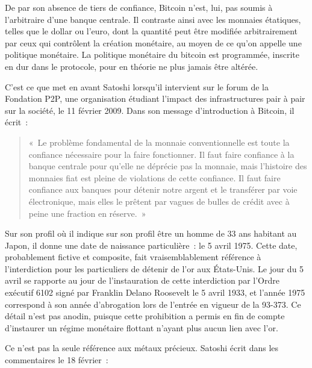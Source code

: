 De par son absence de tiers de confiance, Bitcoin n'est, lui, pas soumis à l'arbitraire d'une banque centrale. Il contraste ainsi avec les monnaies étatiques, telles que le dollar ou l'euro, dont la quantité peut être modifiée arbitrairement par ceux qui contrôlent la création monétaire, au moyen de ce qu'on appelle une politique monétaire. La politique monétaire du bitcoin est programmée, inscrite en dur dans le protocole, pour en théorie ne plus jamais être altérée.

C'est ce que met en avant Satoshi lorsqu'il intervient sur le forum de la Fondation P2P, une organisation étudiant l'impact des infrastructures pair à pair sur la société, le 11 février 2009. Dans son message d'introduction à Bitcoin, il écrit~:

\begin{quote}
«~Le problème fondamental de la monnaie conventionnelle est toute la confiance nécessaire pour la faire fonctionner. Il faut faire confiance à la banque centrale pour qu'elle ne déprécie pas la monnaie, mais l'histoire des monnaies fiat est pleine de violations de cette confiance. Il faut faire confiance aux banques pour détenir notre argent et le transférer par voie électronique, mais elles le prêtent par vagues de bulles de crédit avec à peine une fraction en réserve.~»
\end{quote}

Sur son profil où il indique sur son profil être un homme de 33 ans habitant au Japon, il donne une date de naissance particulière~: le 5 avril 1975. Cette date, probablement fictive et composite, fait vraisemblablement référence à l'interdiction pour les particuliers de détenir de l'or aux États-Unis. Le jour du 5 avril se rapporte au jour de l'instauration de cette interdiction par l'Ordre exécutif 6102 signé par Franklin Delano Roosevelt le 5 avril 1933, et l'année 1975 correspond à son année d'abrogation lors de l'entrée en vigueur de la  93-373. Ce détail n'est pas anodin, puisque cette prohibition a permis en fin de compte d'instaurer un régime monétaire flottant n'ayant plus aucun lien avec l'or.

Ce n'est pas la seule référence aux métaux précieux. Satoshi écrit dans les commentaires le 18 février~:

